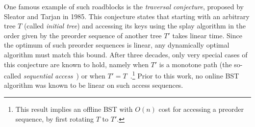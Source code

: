  
One famous example of such roadblocks is the {\em traversal conjecture}, proposed by Sleator and Tarjan in 1985.  
This conjecture states that starting with an arbitrary tree $T$ (called {\em initial tree}) and accessing its keys using the splay algorithm in the order given by the preorder sequence of another tree $T'$ takes linear time.
Since the optimum of such preorder sequences is linear, any dynamically optimal algorithm must match this bound.  
After three decades, only very special cases of this conjecture are known to hold, namely when $T'$ is a monotone path (the so-called \emph{sequential access}~\cite{tarjan_sequential})
or when $T'= T$~\cite{chaudhuri}.\footnote{This result implies an offline BST with $O(n)$ cost for accessing a preorder sequence, by first rotating $T$ to $T'$.}
Prior to this work, no online BST algorithm was known to be linear on such access sequences. 


